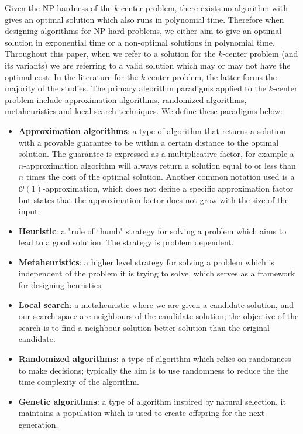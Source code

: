 Given the NP-hardness of the $k$-center problem, there exists no algorithm with gives an optimal solution which also runs in polynomial time. Therefore when designing algorithms for NP-hard problems, we either aim to give an optimal solution in exponential time or a non-optimal solutions in polynomial time. Throughout this paper, when we refer to a solution for the $k$-center problem (and its variants) we are referring to a valid solution which may or may not have the optimal cost. In the literature for the $k$-center problem, the latter forms the majority of the studies. The primary algorithm paradigms applied to the $k$-center problem include approximation algorithms, randomized algorithms, metaheuristics and local search techniques. We define these paradigms below:
\begin{itemize}
    \item \textbf{Approximation algorithms}: a type of algorithm that returns a solution with a provable guarantee to be within a certain distance to the optimal solution. The guarantee is expressed as a multiplicative factor, for example a $n$-approximation algorithm will always return a solution equal to or less than $n$ times the cost of the optimal solution. Another common notation used is a $\mathcal{O}(1)$-approximation, which does not define a specific approximation factor but states that the approximation factor does not grow with the size of the input. 
    \item \textbf{Heuristic}: a "rule of thumb" strategy for solving a problem which aims to lead to a good solution. The strategy is problem dependent.
    \item \textbf{Metaheuristics}: a higher level strategy for solving a problem which is independent of the problem it is trying to solve, which serves as a framework for designing heuristics.
    \item \textbf{Local search}: a metaheuristic where we are given a candidate solution, and our search space are neighbours of the candidate solution; the objective of the search is to find a neighbour solution better solution than the original candidate.
    \item \textbf{Randomized algorithms}: a type of algorithm which relies on randomness to make decisions; typically the aim is to use randomness to reduce the the time complexity of the algorithm.
    \item \textbf{Genetic algorithms}: a type of algorithm inspired by natural selection, it maintains a population which is used to create offspring for the next generation.
\end{itemize}

